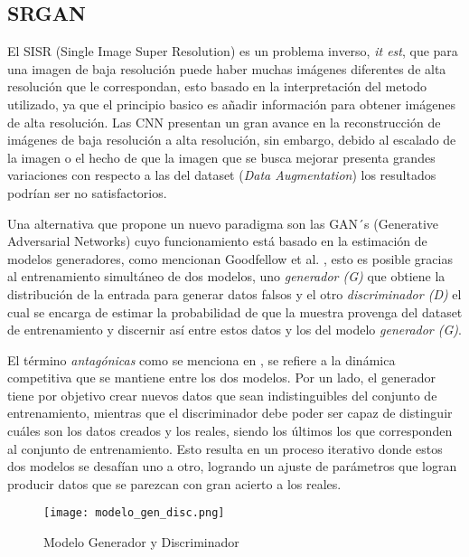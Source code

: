 \subsection{SRGAN}

El SISR (Single Image Super Resolution) es un problema inverso, \emph{it est}, que para una imagen de baja resolución puede haber muchas
imágenes diferentes de alta resolución que le correspondan, esto basado en la interpretación del metodo utilizado, ya que
el principio basico es añadir información para obtener imágenes de alta resolución.
Las CNN presentan un gran avance en la reconstrucción de imágenes de baja resolución a alta resolución,
sin embargo, debido al escalado de la imagen o el hecho de que la imagen que se busca mejorar presenta grandes
variaciones con respecto a las del dataset (\emph{Data Augmentation}) los resultados podrían ser no satisfactorios.


Una alternativa que propone un nuevo paradigma son las GAN´s (Generative Adversarial Networks) cuyo funcionamiento está basado
en la estimación de modelos generadores, como mencionan Goodfellow et al. \cite{GANs}, esto es 
posible gracias al entrenamiento simultáneo de dos modelos, uno \emph{generador (G)} que obtiene 
la distribución de la entrada para generar datos falsos y el otro \emph{discriminador (D)} el cual se encarga de estimar 
la probabilidad de que la muestra provenga del dataset de entrenamiento y discernir así entre estos datos y 
los del modelo \emph{ generador (G)}.

El término \emph{antagónicas} como se menciona en \cite{SRGAN_Tesis}, se refiere a la dinámica 
competitiva que se mantiene entre los dos modelos. Por un lado,
el generador tiene por objetivo crear nuevos datos que sean indistinguibles del
conjunto de entrenamiento, mientras que el discriminador debe poder ser capaz
de distinguir cuáles son los datos creados y los reales, siendo los últimos los que corresponden
 al conjunto de entrenamiento. Esto resulta en un proceso iterativo donde estos dos modelos
 se desafían uno a otro, logrando un ajuste de parámetros
 que logran producir datos que se parezcan con gran acierto a los reales.
 

\begin{figure}[H]
    \begin{center}
      \texttt{[image: modelo\_gen\_disc.png]}
      \caption{Modelo Generador y Discriminador}
      \label{Alexis1}
    \end{center}
\end{figure}

